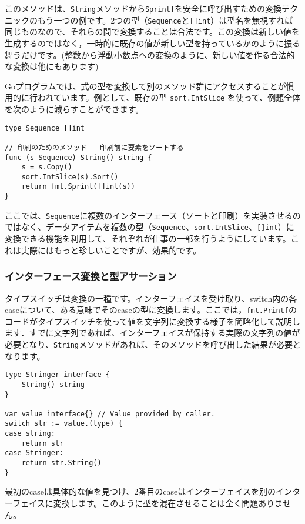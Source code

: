 \documentclass{jsarticle}
\begin{document}
このメソッドは、\texttt{String}メソッドから\texttt{Sprintf}を安全に呼び出すための変換テクニックのもう一つの例です。2つの型（\texttt{Sequence}と\texttt{{[}{]}int}）は型名を無視すれば同じものなので、それらの間で変換することは合法です。この変換は新しい値を生成するのではなく，一時的に既存の値が新しい型を持っているかのように振る舞うだけです。(整数から浮動小数点への変換のように、新しい値を作る合法的な変換は他にもあります)

Goプログラムでは、式の型を変換して別のメソッド群にアクセスすることが慣用的に行われています。例として、既存の型
\texttt{sort.IntSlice}
を使って、例題全体を次のように減らすことができます。

\begin{lstlisting}[numbers=none]
type Sequence []int

// 印刷のためのメソッド - 印刷前に要素をソートする
func (s Sequence) String() string {
    s = s.Copy()
    sort.IntSlice(s).Sort()
    return fmt.Sprint([]int(s))
}
\end{lstlisting}

ここでは、\texttt{Sequence}に複数のインターフェース（ソートと印刷）を実装させるのではなく、データアイテムを複数の型（\texttt{Sequence}、\texttt{sort.IntSlice}、\texttt{{[}{]}int}）に変換できる機能を利用して、それぞれが仕事の一部を行うようにしています。これは実際にはもっと珍しいことですが、効果的です。

\subsubsection{インターフェース変換と型アサーション}

{タイプスイッチ}は変換の一種です。インターフェイスを受け取り、switch内の各caseについて、ある意味でそのcaseの型に変換します。ここでは，\texttt{fmt.Printf}のコードがタイプスイッチを使って値を文字列に変換する様子を簡略化して説明します．すでに文字列であれば、インターフェイスが保持する実際の文字列の値が必要となり、\texttt{String}メソッドがあれば、そのメソッドを呼び出した結果が必要となります。

\begin{lstlisting}[numbers=none]
type Stringer interface {
    String() string
}

var value interface{} // Value provided by caller.
switch str := value.(type) {
case string:
    return str
case Stringer:
    return str.String()
}
\end{lstlisting}

最初のcaseは具体的な値を見つけ、2番目のcaseはインターフェイスを別のインターフェイスに変換します。このように型を混在させることは全く問題ありません。
\end{document}
